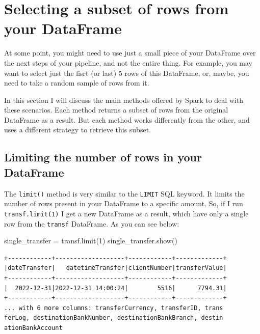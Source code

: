 \documentclass[
  11pt,
  letterpaper,
  DIV=11,
  numbers=noendperiod]{scrreprt}
\newenvironment{Shaded}{\begin{snugshade}}{\end{snugshade}}
\newcommand{\DecValTok}[1]{\textcolor[rgb]{0.68,0.00,0.00}{#1}}
\newcommand{\NormalTok}[1]{\textcolor[rgb]{0.00,0.23,0.31}{#1}}
\newcommand{\OperatorTok}[1]{\textcolor[rgb]{0.37,0.37,0.37}{#1}}
\begin{document}
\section{Selecting a subset of rows from your
DataFrame}\label{selecting-a-subset-of-rows-from-your-dataframe}

At some point, you might need to use just a small piece of your
DataFrame over the next steps of your pipeline, and not the entire
thing. For example, you may want to select just the fisrt (or last) 5
rows of this DataFrame, or, maybe, you need to take a random sample of
rows from it.

In this section I will discuss the main methods offered by Spark to deal
with these scenarios. Each method returns a subset of rows from the
original DataFrame as a result. But each method works differently from
the other, and uses a different strategy to retrieve this subset.

\subsection{Limiting the number of rows in your
DataFrame}\label{limiting-the-number-of-rows-in-your-dataframe}

The \texttt{limit()} method is very similar to the \texttt{LIMIT} SQL
keyword. It limits the number of rows present in your DataFrame to a
specific amount. So, if I run \texttt{transf.limit(1)} I get a new
DataFrame as a result, which have only a single row from the
\texttt{transf} DataFrame. As you can see below:

\begin{Shaded}
\begin{Highlighting}[]
\NormalTok{single\_transfer }\OperatorTok{=}\NormalTok{ transf.limit(}\DecValTok{1}\NormalTok{)}
\NormalTok{single\_transfer.show()}
\end{Highlighting}
\end{Shaded}

\begin{verbatim}
+------------+-------------------+------------+-------------+
|dateTransfer|   datetimeTransfer|clientNumber|transferValue|
+------------+-------------------+------------+-------------+
|  2022-12-31|2022-12-31 14:00:24|        5516|      7794.31|
+------------+-------------------+------------+-------------+
... with 6 more columns: transferCurrency, transferID, trans
ferLog, destinationBankNumber, destinationBankBranch, destin
ationBankAccount
\end{verbatim}
\end{document}
